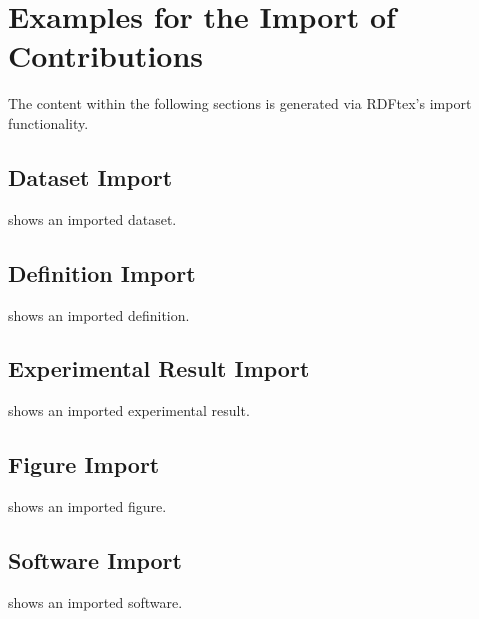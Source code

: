 
\section{Examples for the Import of Contributions}

The content within the following sections is generated via RDFtex's import functionality.

\subsection{Dataset Import}


 shows an imported dataset.

\subsection{Definition Import}


 shows an imported definition.

\subsection{Experimental Result Import}


 shows an imported experimental result.

\subsection{Figure Import}


 shows an imported figure.

\subsection{Software Import}


 shows an imported software.


